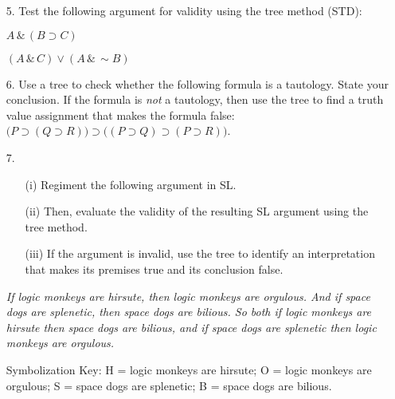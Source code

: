 \documentclass[12pt]{article}
\def\eor{\ensuremath{\vee}}
\def\eand{\ensuremath{\,\&\,}}
\def\eif{\ensuremath{\supset}}
\def\enot{\ensuremath{{\sim}}} %
\let\oldsim\sim %
\renewcommand{\sim}{{\oldsim}} %
\begin{document}
\begin{enumerate}
  \item[5.] Test the following argument for validity using the tree method (STD): 
    \item[] $A \eand (B \eif C)$
      \vspace{-.2in}
    \item[] \underline{\hspace{1.75in}}
      \vspace{-.1in}
    \item[] $(A \eand C) \eor (A \eand \enot B)$
      \vspace{.1in}

  \item[6.] Use a tree to check whether the following formula is a tautology.
    State your conclusion.
    If the formula is \textit{not} a tautology, then use the tree to find a truth value assignment that makes the formula false:
    $\big(P \eif (Q \eif R ) \big) \eif \big( ( P \eif Q) \eif (P \eif R) \big)$.  
  \vspace{.1in}

  \item[7.] 
    \begin{itemize}
      \item[(i)] Regiment the following argument in SL.
      \item[(ii)] Then, evaluate the validity of the resulting SL argument using the tree method.
      \item[(iii)] If the argument is invalid, use the tree to identify an interpretation that makes its premises true and its conclusion false. 
    \end{itemize}
    \item[] \textit{If logic monkeys are hirsute, then logic monkeys are orgulous. And if space dogs are splenetic, then space dogs are bilious. So both if logic monkeys are hirsute then space dogs are bilious, and if space dogs are splenetic then logic monkeys are orgulous.}  
    \item[] Symbolization Key: H = logic monkeys are hirsute; O = logic monkeys are orgulous; S = space dogs are splenetic; B = space dogs are bilious.
      \vspace{.1in}
\end{enumerate}
\end{document}
